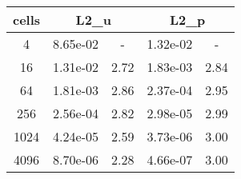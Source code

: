 \documentclass[10pt]{report}
\begin{document}
\begin{table}[H]
\begin{center}
\begin{tabular}{|c|c|c|c|c|} \hline
cells & 
\multicolumn{2}{|c|}{L2_u} & 
\multicolumn{2}{|c|}{L2_p}\\ \hline
4 & 8.65e-02 & - & 1.32e-02 & -\\ \hline
16 & 1.31e-02 & 2.72 & 1.83e-03 & 2.84\\ \hline
64 & 1.81e-03 & 2.86 & 2.37e-04 & 2.95\\ \hline
256 & 2.56e-04 & 2.82 & 2.98e-05 & 2.99\\ \hline
1024 & 4.24e-05 & 2.59 & 3.73e-06 & 3.00\\ \hline
4096 & 8.70e-06 & 2.28 & 4.66e-07 & 3.00\\ \hline
\end{tabular}
\end{center}
\end{table}
\end{document}
